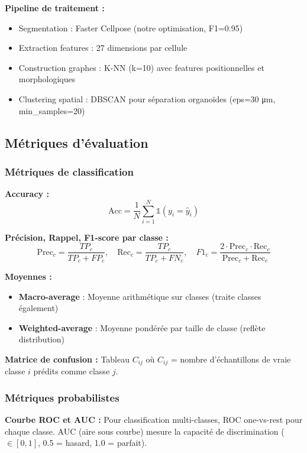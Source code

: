 \textbf{Pipeline de traitement :}
\begin{itemize}
    \item Segmentation : Faster Cellpose (notre optimisation, F1=0.95)
    \item Extraction features : 27 dimensions par cellule
    \item Construction graphes : K-NN (k=10) avec features positionnelles et morphologiques
    \item Clustering spatial : DBSCAN pour séparation organoïdes (eps=30 μm, min\_samples=20)
\end{itemize}

\subsection{Métriques d'évaluation}

\subsubsection{Métriques de classification}

\textbf{Accuracy :}
\[
\text{Acc} = \frac{1}{N}\sum_{i=1}^N \mathbb{1}(y_i = \hat{y}_i)
\]

\textbf{Précision, Rappel, F1-score par classe :}
\[
\text{Prec}_c = \frac{TP_c}{TP_c + FP_c}, \quad \text{Rec}_c = \frac{TP_c}{TP_c + FN_c}, \quad F1_c = \frac{2 \cdot \text{Prec}_c \cdot \text{Rec}_c}{\text{Prec}_c + \text{Rec}_c}
\]

\textbf{Moyennes :}
\begin{itemize}
    \item \textbf{Macro-average} : Moyenne arithmétique sur classes (traite classes également)
    \item \textbf{Weighted-average} : Moyenne pondérée par taille de classe (reflète distribution)
\end{itemize}

\textbf{Matrice de confusion :}
Tableau $C_{ij}$ où $C_{ij}$ = nombre d'échantillons de vraie classe $i$ prédits comme classe $j$.

\subsubsection{Métriques probabilistes}

\textbf{Courbe ROC et AUC :}
Pour classification multi-classes, ROC one-vs-rest pour chaque classe. AUC (aire sous courbe) mesure la capacité de discrimination ($\in [0,1]$, 0.5 = hasard, 1.0 = parfait).

